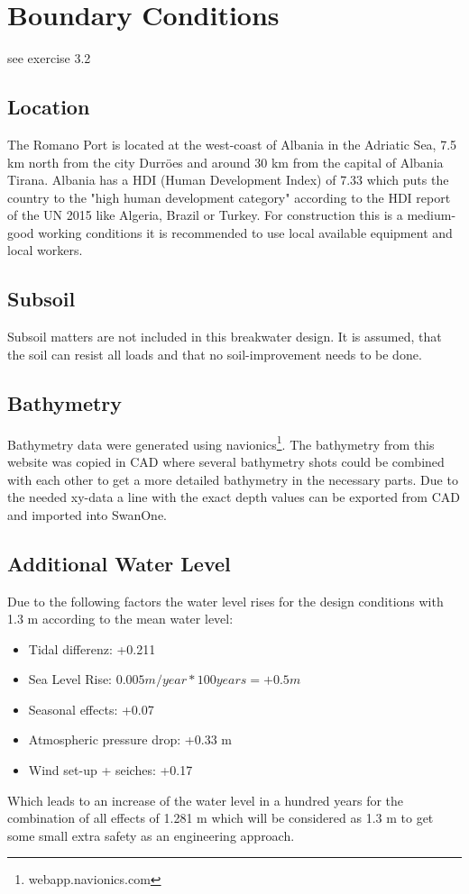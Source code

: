\chapter{Boundary Conditions}

see exercise 3.2

\section{Location}
The Romano Port is located at the west-coast of Albania in the Adriatic Sea, 7.5 km north from the city Durr\"{o}es and around 30 km from the capital of Albania Tirana. 
Albania has a HDI (Human Development Index) of 7.33 which puts the country to the "high human development category" according to the HDI report of the UN 2015 like Algeria, Brazil or Turkey. For construction this is a medium-good working conditions it is recommended to use local available equipment and local workers.

\section{Subsoil}
Subsoil matters are not included in this breakwater design. It is assumed, that the soil can resist all loads and that no soil-improvement needs to be done.

\section{Bathymetry}
Bathymetry data were generated using navionics\footnote{webapp.navionics.com}. The bathymetry from this website was copied in CAD where several bathymetry shots could be combined with each other to get a more detailed bathymetry in the necessary parts. Due to the needed xy-data a line with the exact depth values can be exported from CAD and imported into SwanOne.

\section{Additional Water Level}
Due to the following factors the water level rises for the design conditions with 1.3 m according to the mean water level:
\begin{itemize}
\item Tidal differenz: +0.211
\item Sea Level Rise: $0.005 m/year * 100 years = +0.5 m$
\item Seasonal effects: +0.07
\item Atmospheric pressure drop: +0.33 m
\item Wind set-up + seiches: +0.17	
\end{itemize}
Which leads to an increase of the water level in a hundred years for the combination of all effects of 1.281 m which will be considered as 1.3 m to get some small extra safety as an engineering approach.
